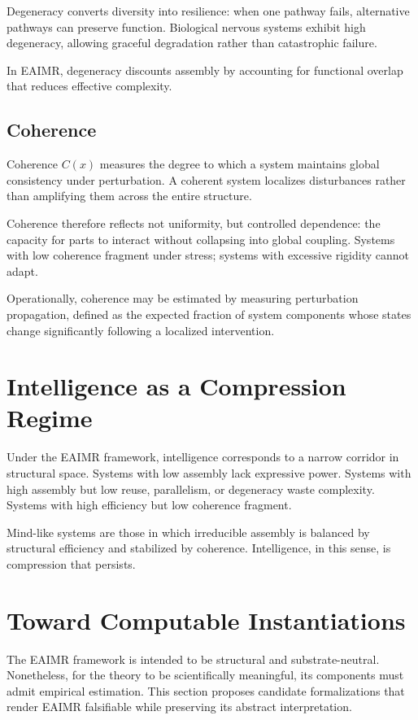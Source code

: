 \documentclass[11pt,letterpaper]{article}
\begin{document}
Degeneracy converts diversity into resilience: when one pathway fails, alternative pathways can preserve function. Biological nervous systems exhibit high degeneracy, allowing graceful degradation rather than catastrophic failure.

In EAIMR, degeneracy discounts assembly by accounting for functional overlap that reduces effective complexity.

\subsection{Coherence}

Coherence $C(x)$ measures the degree to which a system maintains global consistency under perturbation. A coherent system localizes disturbances rather than amplifying them across the entire structure.

Coherence therefore reflects not uniformity, but controlled dependence: the capacity for parts to interact without collapsing into global coupling. Systems with low coherence fragment under stress; systems with excessive rigidity cannot adapt.

Operationally, coherence may be estimated by measuring perturbation propagation, defined as the expected fraction of system components whose states change significantly following a localized intervention.

\section{Intelligence as a Compression Regime}

Under the EAIMR framework, intelligence corresponds to a narrow corridor in structural space. Systems with low assembly lack expressive power. Systems with high assembly but low reuse, parallelism, or degeneracy waste complexity. Systems with high efficiency but low coherence fragment.

Mind-like systems are those in which irreducible assembly is balanced by structural efficiency and stabilized by coherence. Intelligence, in this sense, is compression that persists.

\section{Toward Computable Instantiations}

The EAIMR framework is intended to be structural and substrate-neutral. Nonetheless, for the theory to be scientifically meaningful, its components must admit empirical estimation. This section proposes candidate formalizations that render EAIMR falsifiable while preserving its abstract interpretation.
\end{document}

